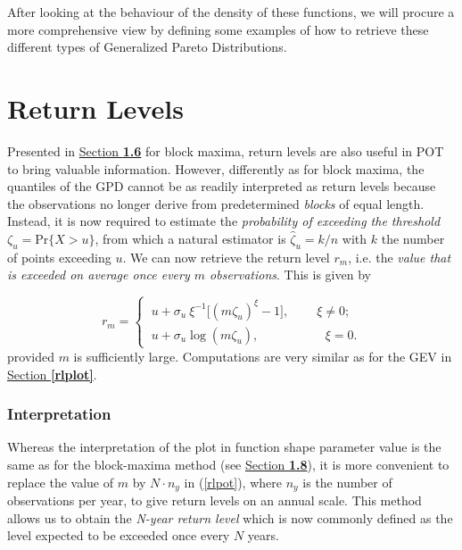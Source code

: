 After looking at the behaviour of the density of these functions, we will procure a more comprehensive view by defining some examples of how to retrieve these different types of Generalized Pareto Distributions.


\section{Return Levels}\label{sec:rl_gpd}

Presented in \hyperref[rlgev]{Section \textbf{1.6}} for block maxima, return levels are also useful in POT to bring valuable information. 
However, differently as for block maxima, the quantiles of the GPD cannot be as readily interpreted as return levels because the observations no longer derive from predetermined \emph{blocks} of equal length. Instead, it is now required to estimate the \emph{probability of exceeding the threshold} $\zeta_u=\text{Pr}\big\{X>u\big\}$, from which a natural estimator is $\hat{\zeta}_u=k/n$ with $k$ the number of points exceeding $u$.
We can now retrieve the return level $r_m$, i.e. the\emph{ value that is exceeded on average once every $m$ observations}. 
This is given by 

\begin{equation}\label{rlpot}
r_m=\begin{cases}
\ u+\sigma_u\ \xi^{-1}\Big[(m\zeta_u)^{\xi}-1\Big], \ \ \ \ \ \ \ \ \  \ \xi\neq 0;\\
\ u +\sigma_u \log(m\zeta_u), \ \quad \ \ \ \ \ \ \  \ \ \ \ \ \ \quad \ \xi =0.
\end{cases}
\end{equation}
provided $m$ is sufficiently large.
Computations are very similar as for the GEV in \hyperref[rlplot]{Section \textbf{\ref{rlplot}}}. 

\subsubsection*{Interpretation}

Whereas the interpretation of the plot in function shape parameter value is the same as for the block-maxima method  (see \hyperref[rlplot]{Section \textbf{1.8}}), it is more convenient to replace the value of $m$ by $N\cdot n_y$ in (\ref{rlpot}), where $n_y$ is the number of observations per year, to give return levels on an annual scale. This method allows us to obtain the\emph{ N-year return level} which is now commonly defined as the level expected to be exceeded once every $N$ years.

